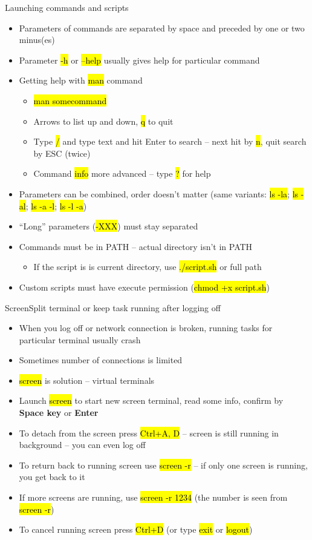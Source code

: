 \documentclass[compress, ucs, xelatex, 11pt, xcolor=svgnames,
  hyperref={
    bookmarks=true,
    unicode=true,
    colorlinks=true,
    pdftitle={Linux, command line and MetaCentrum},
    plainpages=false,
    pdfauthor={Vojtech Zeisek},
    pdfsubject={Course about use of Linux command line, writing shell scripts and using MetaCentrum of CESNET},
    pdfcreator={XeLaTeX},
    pdfkeywords={Linux, GNU, BASH, shell, command line, MetaCentrum},
    linkcolor=DarkRed,
    anchorcolor=DarkBlue,
    citecolor=Indigo,
    filecolor=NavyBlue,
    menucolor=DarkMagenta,
    urlcolor=DarkBlue,
    pdftex},
  url={hyphens, lowtilde} %
  ]{beamer}
\renewcommand{\texttt}[1]{\hl{\ttfamily #1}}
\begin{document}
\begin{frame}{Launching commands and scripts}
\begin{itemize}
  \item Parameters of commands are separated by space and preceded by one or two minus(es)
  \item Parameter \texttt{-h} or \texttt{--help} usually gives help for particular command
  \item Getting help with \texttt{man} command
  \begin{itemize}
    \item \texttt{man somecommand}
    \item Arrows to list up and down, \texttt{q} to quit
    \item Type \texttt{/} and type text and hit Enter to search -- next hit by \texttt{n}, quit search by ESC (twice)
    \item Command \texttt{info} more advanced -- type \texttt{?} for help
  \end{itemize}
  \item Parameters can be combined, order doesn't matter (same variants: \texttt{ls -la}; \texttt{ls -al}; \texttt{ls -a -l}; \texttt{ls -l -a})
  \item ``Long'' parameters (\texttt{{-}-XXX}) must stay separated
  \item Commands must be in PATH -- actual directory isn't in PATH
  \begin{itemize}
    \item If the script is is current directory, use \texttt{./script.sh} or full path
  \end{itemize}
  \item Custom scripts must have execute permission (\texttt{chmod +x script.sh})
\end{itemize}
\end{frame}

\begin{frame}{Screen}{Split terminal or keep task running after logging off}
\begin{itemize}
  \item When you log off or network connection is broken, running tasks for particular terminal usually crash
  \item Sometimes number of connections is limited
  \item \texttt{screen} is solution -- virtual terminals
  \item Launch \texttt{screen} to start new screen terminal, read some info, confirm by \textbf{Space key} or \textbf{Enter}
  \item To detach from the screen press \texttt{Ctrl+A, D} -- screen is still running in background -- you can even log off
  \item To return back to running screen use \texttt{screen -r} -- if only one screen is running, you get back to it
  \item If more screens are running, use \texttt{screen -r 1234} (the number is seen from \texttt{screen -r})
  \item To cancel running screen press \texttt{Ctrl+D} (or type \texttt{exit} or \texttt{logout})
\end{itemize}
\end{frame}
\end{document}
